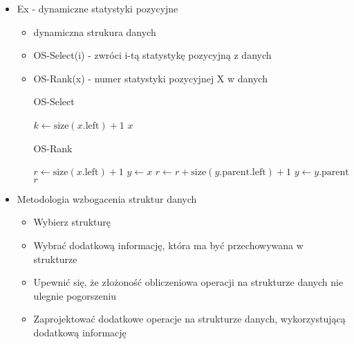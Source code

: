 \documentclass{article}
\begin{document}
    \begin{itemize}
        \item Ex - dynamiczne statystyki pozycyjne
        \begin{itemize}
            \item dynamiczna strukura danych
            \item OS-Select(i) - zwróci i-tą statystykę pozycyjną z danych
            \item OS-Rank(x) - numer statystyki pozycyjnej X w danych
            
            \begin{algorithm}[H]
                \caption{OS-Select}\label{alg:os-select}
                \begin{algorithmic}[1]
                        \State $k \gets \text{size}(x.\text{left}) + 1$
                            \State \Return $x$
                            \State \Return {}
                        \Else
                            \State \Return {}
                        \EndIf
                    \EndProcedure
                \end{algorithmic}
            \end{algorithm}
            
            \begin{algorithm}[H]
                \caption{OS-Rank}\label{alg:os-rank}
                \begin{algorithmic}[1]
                        \State $r \gets \text{size}(x.\text{left}) + 1$
                        \State $y \gets x$
                                \State $r \gets r + \text{size}(y.\text{parent.left}) + 1$
                            \EndIf
                            \State $y \gets y.\text{parent}$
                        \EndWhile
                        \State \Return $r$
                    \EndProcedure
                \end{algorithmic}
            \end{algorithm}
        \end{itemize}
        \item Metodologia wzbogacenia struktur danych
        \begin{itemize}
            \item Wybierz strukturę
            \item Wybrać dodatkową informację, która ma być przechowywana w strukturze
            \item Upewnić się, że złożoność obliczeniowa operacji na strukturze danych nie ulegnie pogorszeniu
            \item Zaprojektować dodatkowe operacje na strukturze danych, wykorzystującą dodatkową informację
        \end{itemize}
    \end{itemize}
\end{document}
